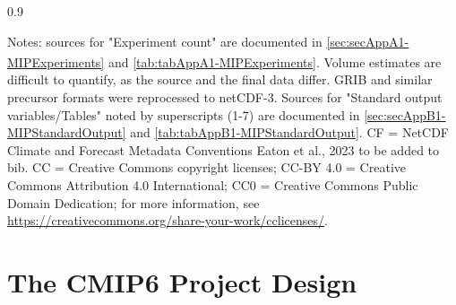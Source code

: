 \documentclass[gmd, preprint]{copernicus}
\def\cred#1{{\color{red}#1}}
\begin{document}
\begin{table}[htp]
{\begin{tabularx}{0.9\textwidth}
\end{tabularx}
} %
\label{tab:tab1-MIPsThroughTime}
\footnotesize{Notes: sources for "Experiment count" are documented in \autoref{sec:secAppA1-MIPExperiments} and \autoref{tab:tabAppA1-MIPExperiments}. {}\textsuperscript{\textdagger}Volume estimates are difficult to quantify, as the source and the final data differ. GRIB and similar precursor formats were reprocessed to netCDF-3. Sources for "Standard output variables/Tables" noted by superscripts (1-7) are documented in \autoref{sec:secAppB1-MIPStandardOutput} and \autoref{tab:tabAppB1-MIPStandardOutput}. CF = NetCDF Climate and Forecast Metadata Conventions \cred{Eaton et al., 2023 to be added to bib}. CC = Creative Commons copyright licenses; CC-BY 4.0 = Creative Commons Attribution 4.0 International; CC0 = Creative Commons Public Domain Dedication; for more information, see \url{https://creativecommons.org/share-your-work/cclicenses/}.}
\end{table}

\section{The CMIP6 Project Design}
\label{sec:cmip6ProjectDesign}
\end{document}
